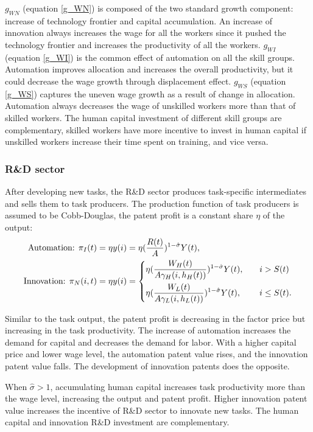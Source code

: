\documentclass[12pt]{article}
\begin{document}
$g_{WN}$ (equation \ref{g_WN}) is composed of the two standard growth component: increase of technology frontier and capital accumulation. An increase of innovation always increases the wage for all the workers since it pushed the technology frontier and increases the productivity of all the workers. $g_{WI}$ (equation \ref{g_WI}) is the common effect of automation on all the skill groups. Automation improves allocation and increases the overall productivity, but it could decrease the wage growth through displacement effect. $g_{WS}$ (equation \ref{g_WS}) captures the uneven wage growth as a result of change in allocation. Automation always decreases the wage of unskilled workers more than that of skilled workers. The human capital investment of different skill groups are complementary, skilled workers have more incentive to invest in human capital if unskilled workers increase their time spent on training, and vice versa. 

\subsubsection*{R\&D sector}
After developing new tasks, the R\&D sector produces task-specific intermediates and sells them to task producers. The production function of task producers is assumed to be Cobb-Douglas, the patent profit is a constant share $\eta$ of the output: 
\begin{align*}
\text{Automation: } \pi_I(t)& =\eta y(i) = \eta(\frac{R(t)}{A})^{1-\hat{\sigma}}Y(t), \\
\text{Innovation: } \pi_N(i,t)&= \eta y(i) = 
\begin{dcases}
\eta(\frac{W_H(t)}{A\gamma_H(i,h_H(t))})^{1-\hat{\sigma}}Y(t),  \quad & i>S(t)  \\
\eta(\frac{W_L(t)}{A\gamma_L(i,h_L(t))})^{1-\hat{\sigma}}Y(t),  \quad & i \leq S(t).
\end{dcases}
\end{align*}

Similar to the task output, the patent profit is decreasing in the factor price but increasing in the task productivity. The increase of automation increases the demand for capital and decreases the demand for labor. With a higher capital price and lower wage level, the automation patent value rises, and the innovation patent value falls. The development of innovation patents does the opposite. 

When $\hat{\sigma}>1$, accumulating human capital increases task productivity more than the wage level, increasing the output and patent profit. Higher innovation patent value increases the incentive of R\&D sector to innovate new tasks. The human capital and innovation R\&D investment are complementary. 
\end{document}
